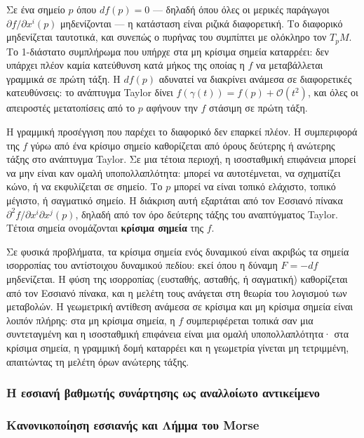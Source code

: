 \documentclass[11pt,a4paper,twoside,openright]{book}
\begin{document}
Σε ένα σημείο $p$ όπου $df(p) = 0$ --- δηλαδή όπου όλες οι μερικές παράγωγοι $\partial f / \partial x^i(p)$ μηδενίζονται --- η κατάσταση είναι ριζικά διαφορετική. Το διαφορικό μηδενίζεται ταυτοτικά, και συνεπώς ο πυρήνας του συμπίπτει με ολόκληρο τον $T_pM$. Το 1-διάστατο συμπλήρωμα που υπήρχε στα μη κρίσιμα σημεία καταρρέει: δεν υπάρχει πλέον καμία κατεύθυνση κατά μήκος της οποίας η $f$ να μεταβάλλεται γραμμικά σε πρώτη τάξη. Η $df(p)$ αδυνατεί να διακρίνει ανάμεσα σε διαφορετικές κατευθύνσεις: το ανάπτυγμα Taylor δίνει $f(\gamma(t)) = f(p) + \mathcal{O}(t^2)$, και όλες οι απειροστές μετατοπίσεις από το $p$ αφήνουν την $f$ στάσιμη σε πρώτη τάξη.

Η γραμμική προσέγγιση που παρέχει το διαφορικό δεν επαρκεί πλέον. Η συμπεριφορά της $f$ γύρω από ένα κρίσιμο σημείο καθορίζεται από όρους δεύτερης ή ανώτερης τάξης στο ανάπτυγμα Taylor. Σε μια τέτοια περιοχή, η ισοσταθμική επιφάνεια μπορεί να μην είναι καν ομαλή υποπολλαπλότητα: μπορεί να αυτοτέμνεται, να σχηματίζει κώνο, ή να εκφυλίζεται σε σημείο. Το $p$ μπορεί να είναι τοπικό ελάχιστο, τοπικό μέγιστο, ή σαγματικό σημείο. Η διάκριση αυτή εξαρτάται από τον Εσσιανό πίνακα $\partial^2 f / \partial x^i \partial x^j(p)$, δηλαδή από τον όρο δεύτερης τάξης του αναπτύγματος Taylor. Τέτοια σημεία ονομάζονται \textbf{κρίσιμα σημεία} της $f$.

Σε φυσικά προβλήματα, τα κρίσιμα σημεία ενός δυναμικού είναι ακριβώς τα σημεία ισορροπίας του αντίστοιχου δυναμικού πεδίου: εκεί όπου η δύναμη $F = -df$ μηδενίζεται. Η φύση της ισορροπίας (ευσταθής, ασταθής, ή σαγματική) καθορίζεται από τον Εσσιανό πίνακα, και η μελέτη τους ανάγεται στη θεωρία του λογισμού των μεταβολών. Η γεωμετρική αντίθεση ανάμεσα σε κρίσιμα και μη κρίσιμα σημεία είναι λοιπόν πλήρης: στα μη κρίσιμα σημεία, η $f$ συμπεριφέρεται τοπικά σαν μια συντεταγμένη και η ισοσταθμική επιφάνεια είναι μια ομαλή υποπολλαπλότητα· στα κρίσιμα σημεία, η γραμμική δομή καταρρέει και η γεωμετρία γίνεται μη τετριμμένη, απαιτώντας τη μελέτη όρων ανώτερης τάξης.

\subsubsection{Η εσσιανή βαθμωτής συνάρτησης ως αναλλοίωτο αντικείμενο}

\subsubsection{Κανονικοποίηση εσσιανής και Λήμμα του Morse}
\end{document}

